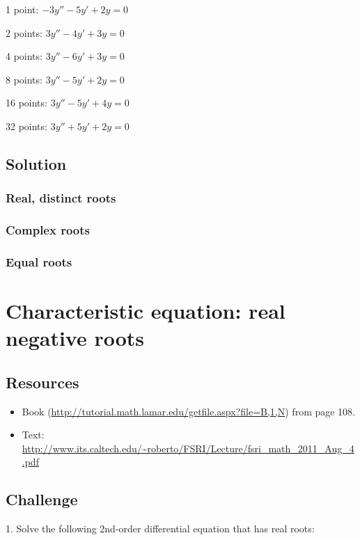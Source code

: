 1 point: $\displaystyle -3 y'' - 5 y' + 2 y = 0$ %

2 points: $\displaystyle 3 y'' - 4 y' + 3 y = 0$ %

4 points: $\displaystyle 3 y'' - 6 y' + 3 y = 0$ %

8 points: $\displaystyle 3 y'' - 5 y' + 2 y = 0$ %

16 points: $\displaystyle 3 y'' - 5 y' + 4 y = 0$ %

32 points: $\displaystyle 3 y'' + 5 y' + 2 y = 0$ %

\subsection*{Solution}

\subsubsection*{Real, distinct roots}

\subsubsection*{Complex roots}

\subsubsection{Equal roots}




\newpage
\section{Characteristic equation: real negative roots}

\subsection*{Resources}
\begin{itemize}
    \item Book (\url{http://tutorial.math.lamar.edu/getfile.aspx?file=B,1,N}) from page 108.
    \item Text: \url{http://www.its.caltech.edu/~roberto/FSRI/Lecture/fsri_math_2011_Aug_4.pdf}
\end{itemize}

\subsection*{Challenge}
1. Solve the following 2nd-order differential equation that has real roots:

